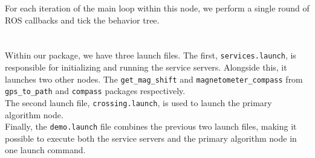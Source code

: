             For each iteration of the main loop within this node, we perform a single round of ROS callbacks and tick the behavior tree.\\\\
        \\
            Within our package, we have three launch files. The first, \texttt{services.launch}, is responsible for initializing and running the service servers. Alongside this, it launches two other nodes. The \texttt{get\_mag\_shift} and \texttt{magnetometer\_compass} from \texttt{gps\_to\_path} and \texttt{compass} packages respectively.\\
            The second launch file, \texttt{crossing.launch}, is used to launch the primary algorithm node.\\
            Finally, the \texttt{demo.launch} file combines the previous two launch files, making it possible to execute both the service servers and the primary algorithm node in one launch command.
    